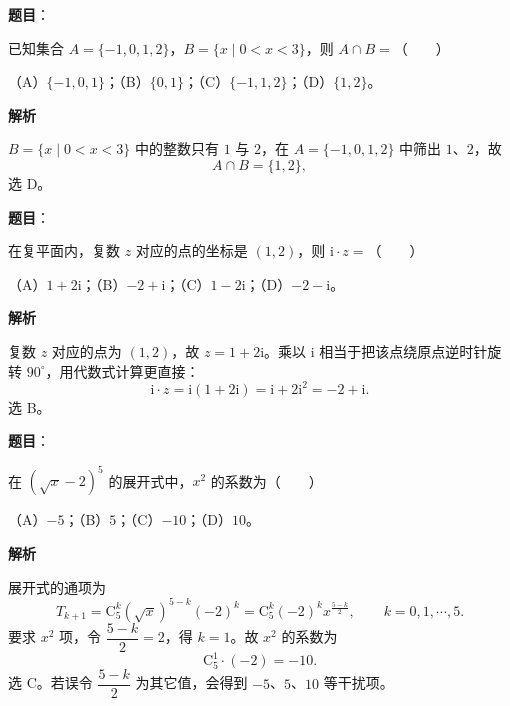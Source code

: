 

\begin{answer}

\textbf{题目}：

已知集合 $A=\{-1,0,1,2\}$，$B=\{x\mid 0<x<3\}$，则 $A\cap B=$\mbox{（　　）}

（A）$\{-1,0,1\}$；（B）$\{0,1\}$；（C）$\{-1,1,2\}$；（D）$\{1,2\}$。

\textbf{解析}

$B=\{x\mid0<x<3\}$ 中的整数只有 $1$ 与 $2$，在 $A=\{-1,0,1,2\}$ 中筛出 $1$、$2$，故
\nopagebreak[4]
\[A\cap B=\{1,2\},\]
选 D。


\end{answer}
\begin{answer}

\textbf{题目}：

在复平面内，复数 $z$ 对应的点的坐标是 $(1,2)$，则 $\mathrm i\cdot z=$\mbox{（　　）}

（A）$1+2\mathrm i$；（B）$-2+\mathrm i$；（C）$1-2\mathrm i$；（D）$-2-\mathrm i$。

\textbf{解析}

复数 $z$ 对应的点为 $(1,2)$，故 $z=1+2\mathrm i$。乘以 $\mathrm i$ 相当于把该点绕原点逆时针旋转 $90^\circ$，用代数式计算更直接：
\nopagebreak[4]
\[\mathrm i\cdot z=\mathrm i(1+2\mathrm i)=\mathrm i+2\mathrm i^2=-2+\mathrm i .\]
选 B。


\end{answer}
\begin{answer}

\textbf{题目}：

在 $(\sqrt x-2)^5$ 的展开式中，$x^2$ 的系数为\mbox{（　　）}

（A）$-5$；（B）$5$；（C）$-10$；（D）$10$。

\textbf{解析}

展开式的通项为
\nopagebreak[4]
\[T_{k+1}=\mathrm C_5^k\left(\sqrt x\right)^{5-k}(-2)^k=\mathrm C_5^k(-2)^k x^{\frac{5-k}2},\qquad k=0,1,\cdots,5 .\]
要求 $x^2$ 项，令 $\dfrac{5-k}2=2$，得 $k=1$。故 $x^2$ 的系数为
\nopagebreak[4]
\[\mathrm C_5^1\cdot(-2)=-10 .\]
选 C。若误令 $\dfrac{5-k}2$ 为其它值，会得到 $-5$、$5$、$10$ 等干扰项。


\end{answer}
